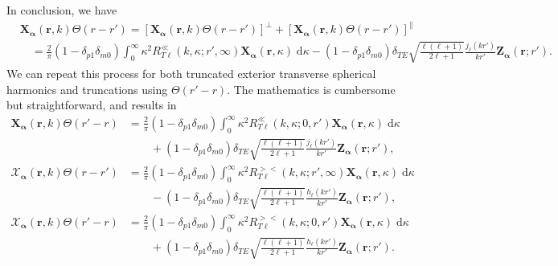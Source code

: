 \documentclass{article}
\begin{document}
In conclusion, we have
\begin{equation}
\begin{split}
&\mathbf{X}_{\bm{\alpha}}(\mathbf{r},k)\Theta(r - r') = \left[\mathbf{X}_{\bm{\alpha}}(\mathbf{r},k)\Theta(r - r')\right]^\perp + \left[\mathbf{X}_{\bm{\alpha}}(\mathbf{r},k)\Theta(r - r')\right]^\parallel\\
&\quad= \frac{2}{\pi}(1 - \delta_{p1}\delta_{m0})\int_0^\infty\kappa^2R_{T\ell}^\ll(k,\kappa;r',\infty)\mathbf{X}_{\bm{\alpha}}(\mathbf{r},\kappa)\;\mathrm{d}\kappa - (1 - \delta_{p1}\delta_{m0})\delta_{TE}\sqrt{\frac{\ell(\ell + 1)}{2\ell + 1}}\frac{j_\ell(kr')}{kr'}\mathbf{Z}_{\bm{\alpha}}(\mathbf{r};r').
\end{split}
\end{equation}
We can repeat this process for both truncated exterior transverse spherical harmonics and truncations using $\Theta(r' - r)$. The mathematics is cumbersome but straightforward, and results in
\begin{equation}
\begin{split}
\mathbf{X}_{\bm{\alpha}}(\mathbf{r},k)\Theta(r' - r) &= \frac{2}{\pi}(1 - \delta_{p1}\delta_{m0})\int_0^\infty\kappa^2R_{T\ell}^\ll(k,\kappa;0,r')\mathbf{X}_{\bm{\alpha}}(\mathbf{r},\kappa)\;\mathrm{d}\kappa\\
&\qquad + (1 - \delta_{p1}\delta_{m0})\delta_{TE}\sqrt{\frac{\ell(\ell + 1)}{2\ell + 1}}\frac{j_\ell(kr')}{kr'}\mathbf{Z}_{\bm{\alpha}}(\mathbf{r};r'),\\[1.0em]
\bm{\mathcal{X}}_{\bm{\alpha}}(\mathbf{r},k)\Theta(r - r') &= \frac{2}{\pi}(1 - \delta_{p1}\delta_{m0})\int_0^\infty\kappa^2R_{T\ell}^{><}(k,\kappa;r',\infty)\mathbf{X}_{\bm{\alpha}}(\mathbf{r},\kappa)\;\mathrm{d}\kappa\\
&\qquad- (1 - \delta_{p1}\delta_{m0})\delta_{TE}\sqrt{\frac{\ell(\ell + 1)}{2\ell + 1}}\frac{h_\ell(kr')}{kr'}\mathbf{Z}_{\bm{\alpha}}(\mathbf{r};r'),\\[1.0em]
\bm{\mathcal{X}}_{\bm{\alpha}}(\mathbf{r},k)\Theta(r' - r) &= \frac{2}{\pi}(1 - \delta_{p1}\delta_{m0})\int_0^\infty\kappa^2R_{T\ell}^{><}(k,\kappa;0,r')\mathbf{X}_{\bm{\alpha}}(\mathbf{r},\kappa)\;\mathrm{d}\kappa\\
&\qquad+ (1 - \delta_{p1}\delta_{m0})\delta_{TE}\sqrt{\frac{\ell(\ell + 1)}{2\ell + 1}}\frac{h_\ell(kr')}{kr'}\mathbf{Z}_{\bm{\alpha}}(\mathbf{r};r').
\end{split}
\end{equation}
\end{document}
